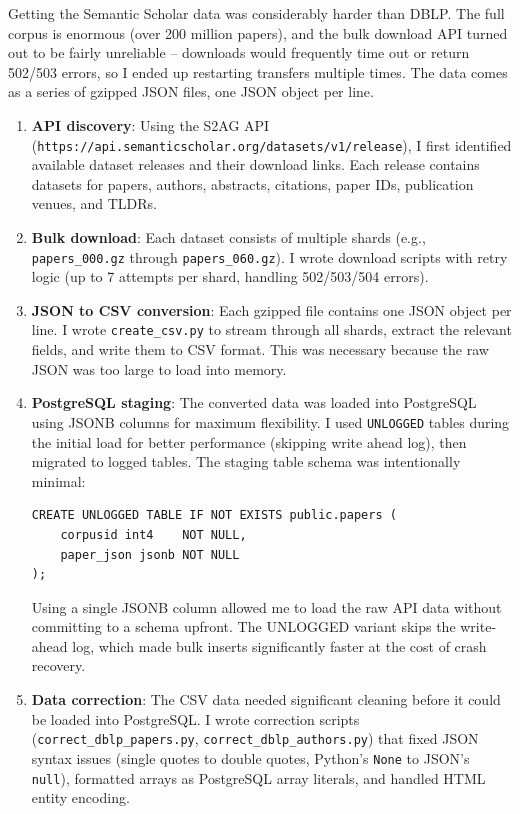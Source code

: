 \documentclass{article}
\begin{document}
Getting the Semantic Scholar data was considerably harder than DBLP.
The full corpus is enormous (over 200 million papers), and the bulk download API turned out to be fairly unreliable -- downloads would frequently time out or return 502/503 errors, so I ended up restarting transfers multiple times.
The data comes as a series of gzipped JSON files, one JSON object per line.

\begin{enumerate}
    \item \textbf{API discovery}: Using the S2AG API (\texttt{https://api.semanticscholar.org/datasets/v1/release}), I first identified available dataset releases and their download links. Each release contains datasets for papers, authors, abstracts, citations, paper IDs, publication venues, and TLDRs.
    \item \textbf{Bulk download}: Each dataset consists of multiple shards (e.g., \texttt{papers\_000.gz} through \texttt{papers\_060.gz}). I wrote download scripts with retry logic (up to 7 attempts per shard, handling 502/503/504 errors).
    \item \textbf{JSON to CSV conversion}: Each gzipped file contains one JSON object per line. I wrote \texttt{create\_csv.py} to stream through all shards, extract the relevant fields, and write them to CSV format. This was necessary because the raw JSON was too large to load into memory.
    \item \textbf{PostgreSQL staging}: The converted data was loaded into PostgreSQL using JSONB columns for maximum flexibility. I used \texttt{UNLOGGED} tables during the initial load for better performance (skipping write ahead log), then migrated to logged tables. The staging table schema was intentionally minimal:

\begin{lstlisting}[caption={JSONB staging table for Semantic Scholar papers.},label={lst:staging}]
CREATE UNLOGGED TABLE IF NOT EXISTS public.papers (
    corpusid int4    NOT NULL,
    paper_json jsonb NOT NULL
);
\end{lstlisting}

    Using a single JSONB column allowed me to load the raw API data without committing to a schema upfront. The UNLOGGED variant skips the write-ahead log, which made bulk inserts significantly faster at the cost of crash recovery.

    \item \textbf{Data correction}: The CSV data needed significant cleaning before it could be loaded into PostgreSQL. I wrote correction scripts (\texttt{correct\_dblp\_papers.py}, \texttt{correct\_dblp\_authors.py}) that fixed JSON syntax issues (single quotes to double quotes, Python's \texttt{None} to JSON's \texttt{null}), formatted arrays as PostgreSQL array literals, and handled HTML entity encoding.
\end{enumerate}
\end{document}
